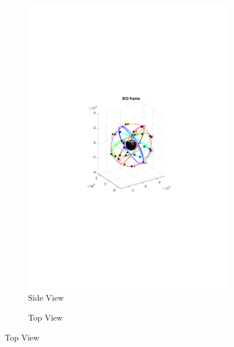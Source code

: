 \begin{figure}[!h]
\centering
\caption{GPS Constellation in Earth-Centered Inertial frame}
\label{fig:GPS_ECI_side}
\begin{subfigure}[t]{0.49\linewidth}
\centering
\caption{Side View}
\includegraphics[trim=6cm 9.5cm 6cm 10cm,clip,width=0.8\linewidth]{ChapterLiteratureReview/GPS_ECI_side}
\end{subfigure}
\begin{subfigure}[t]{0.49\linewidth}
\centering
\caption{Top View}

\end{subfigure}
\end{figure}
